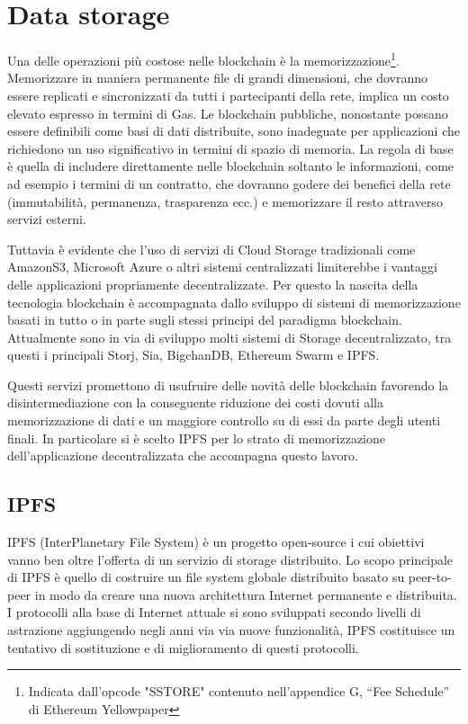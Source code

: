\section{Data storage}

Una delle operazioni più costose nelle blockchain è la memorizzazione\footnote{Indicata dall'opcode "SSTORE" contenuto nell'appendice G, “Fee Schedule” di Ethereum Yellowpaper}. Memorizzare in maniera permanente file di grandi dimensioni, che dovranno essere replicati e sincronizzati da tutti i partecipanti della rete, implica un costo elevato espresso in termini di Gas. Le blockchain pubbliche, nonostante possano essere definibili come basi di dati distribuite, sono inadeguate per applicazioni che richiedono un uso significativo in termini di spazio di memoria. La regola di base è quella di includere direttamente nelle blockchain soltanto le informazioni, come ad esempio i termini di un contratto, che dovranno godere dei benefici della rete (immutabilità, permanenza, trasparenza ecc.) e memorizzare il resto attraverso servizi esterni.

Tuttavia è evidente che l'uso di servizi di Cloud Storage tradizionali come AmazonS3, Microsoft Azure o altri sistemi centralizzati limiterebbe i vantaggi delle applicazioni propriamente decentralizzate. Per questo la nascita della tecnologia blockchain è accompagnata dallo sviluppo di sistemi di memorizzazione basati in tutto o in parte sugli stessi principi del paradigma blockchain. Attualmente sono in via di sviluppo molti sistemi di Storage decentralizzato, tra questi i principali Storj, Sia, BigchanDB, Ethereum Swarm e IPFS.

Questi servizi promettono di usufruire delle novità delle blockchain favorendo la disintermediazione con la conseguente riduzione dei costi dovuti alla memorizzazione di dati e un maggiore controllo su di essi da parte degli utenti finali. In particolare si è scelto IPFS per lo strato di memorizzazione dell'applicazione decentralizzata che accompagna questo lavoro.

\subsection{IPFS}

IPFS (InterPlanetary File System) è un progetto open-source i cui obiettivi vanno ben oltre l'offerta di un servizio di storage distribuito. Lo scopo principale di IPFS è quello di costruire un file system globale distribuito basato su peer-to-peer in modo da creare una nuova architettura Internet permanente e distribuita. I protocolli alla base di Internet attuale si sono sviluppati secondo livelli di astrazione aggiungendo negli anni via via nuove funzionalità, IPFS costituisce un tentativo di sostituzione e di miglioramento di questi protocolli. 

